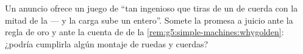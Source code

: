 \begin{exercise}[$\star\star$]\label{exo:g5:simple-machines:11}
Un anuncio ofrece un juego de  ``tan ingenioso que tiras de un
 de cuerda con la mitad de la  --- y la carga sube un
 entero''. Somete la promesa a juicio ante la regla de oro y
ante la cuenta de  de la
\cref{rem:g5:simple-machines:whygolden}: ¿podría cumplirla algún
montaje de ruedas y cuerdas?
\end{exercise}
